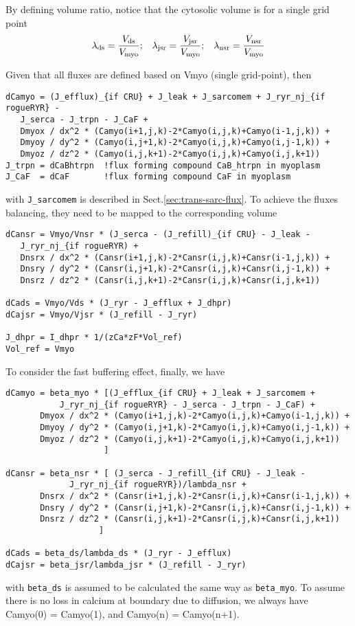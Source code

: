 By defining volume ratio, notice that the cytosolic volume is for a single grid
point
\begin{equation}
\lambda_{\text{ds}} = \frac{V_{\text{ds}}}{V_{\text{myo}}};\;\;\;
\lambda_{\text{jsr}} = \frac{V_{\text{jsr}}}{V_{\text{myo}}};\;\;\;
\lambda_{\text{nsr}} = \frac{V_{\text{nsr}}}{V_{\text{myo}}}
\end{equation}

Given that all fluxes are defined based on Vmyo (single grid-point), then 
\begin{verbatim}
dCamyo = (J_efflux)_{if CRU} + J_leak + J_sarcomem + J_ryr_nj_{if rogueRYR} -
   J_serca - J_trpn - J_CaF + 
   Dmyox / dx^2 * (Camyo(i+1,j,k)-2*Camyo(i,j,k)+Camyo(i-1,j,k)) +
   Dmyoy / dy^2 * (Camyo(i,j+1,k)-2*Camyo(i,j,k)+Camyo(i,j-1,k)) +
   Dmyoz / dz^2 * (Camyo(i,j,k+1)-2*Camyo(i,j,k)+Camyo(i,j,k+1)) 
J_trpn = dCaBhtrpn  !flux forming compound CaB_htrpn in myoplasm
J_CaF  = dCaF       !flux forming compound CaF in myoplasm
\end{verbatim}
with \verb!J_sarcomem! is described in Sect.\ref{sec:trans-sarc-flux}.
To achieve the fluxes balancing, they need to be mapped to the corresponding
volume
\begin{verbatim}
dCansr = Vmyo/Vnsr * (J_serca - (J_refill)_{if CRU} - J_leak - 
   J_ryr_nj_{if rogueRYR) + 
   Dnsrx / dx^2 * (Cansr(i+1,j,k)-2*Cansr(i,j,k)+Cansr(i-1,j,k)) +
   Dnsry / dy^2 * (Cansr(i,j+1,k)-2*Cansr(i,j,k)+Cansr(i,j-1,k)) +
   Dnsrz / dz^2 * (Cansr(i,j,k+1)-2*Cansr(i,j,k)+Cansr(i,j,k+1)) 
   
dCads = Vmyo/Vds * (J_ryr - J_efflux + J_dhpr)
dCajsr = Vmyo/Vjsr * (J_refill - J_ryr)

J_dhpr = I_dhpr * 1/(zCa*zF*Vol_ref)
Vol_ref = Vmyo
\end{verbatim}

To consider the fast buffering effect, finally, we have
\begin{verbatim}
dCamyo = beta_myo * [(J_efflux_{if CRU} + J_leak + J_sarcomem + 
           J_ryr_nj_{if rogueRYR} - J_serca - J_trpn - J_CaF) + 
       Dmyox / dx^2 * (Camyo(i+1,j,k)-2*Camyo(i,j,k)+Camyo(i-1,j,k)) + 
       Dmyoy / dy^2 * (Camyo(i,j+1,k)-2*Camyo(i,j,k)+Camyo(i,j-1,k)) + 
       Dmyoz / dz^2 * (Camyo(i,j,k+1)-2*Camyo(i,j,k)+Camyo(i,j,k+1)) 
                    ]
   
dCansr = beta_nsr * [ (J_serca - J_refill_{if CRU} - J_leak -
             J_ryr_nj_{if rogueRYR})/lambda_nsr + 
       Dnsrx / dx^2 * (Cansr(i+1,j,k)-2*Cansr(i,j,k)+Cansr(i-1,j,k)) +
       Dnsry / dy^2 * (Cansr(i,j+1,k)-2*Cansr(i,j,k)+Cansr(i,j-1,k)) +
       Dnsrz / dz^2 * (Cansr(i,j,k+1)-2*Cansr(i,j,k)+Cansr(i,j,k+1)) 
                   ]
   
dCads = beta_ds/lambda_ds * (J_ryr - J_efflux)
dCajsr = beta_jsr/lambda_jsr * (J_refill - J_ryr)
\end{verbatim}
with \verb!beta_ds! is assumed to be calculated the same way as \verb!beta_myo!.
To assume there is no loss in calcium at boundary due to diffusion, we always
have Camyo(0) = Camyo(1), and Camyo(n) = Camyo(n+1).

